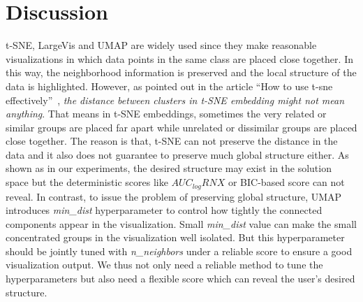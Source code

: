 \section{Discussion}\label{sec:discussion}

t-SNE, LargeVis and UMAP are widely used since they make reasonable visualizations in which data points in the same class are placed close together.
In this way, the neighborhood information is preserved and the local structure of the data is highlighted.
However, as pointed out in the article ``How to use t-sne effectively''~\cite{wattenberg2016use}, \emph{the distance between clusters in t-SNE embedding might not mean anything}.
That means in t-SNE embeddings, sometimes the very related or similar groups are placed far apart while unrelated or dissimilar groups are placed close together.
The reason is that, t-SNE can not preserve the distance in the data and it also does not guarantee to preserve much global structure either.
As shown as in our experiments, the desired structure may exist in the solution space but the deterministic scores like $AUC_{log}RNX$ or BIC-based score can not reveal.
In contrast, to issue the problem of preserving global structure, UMAP introduces \emph{min\_dist} hyperparameter to control how tightly the connected components appear in the visualization.
Small \emph{min\_dist} value can make the small concentrated groups in the visualization well isolated.
But this hyperparameter should be jointly tuned with \emph{n\_neighbors} under a reliable score to ensure a good visualization output.
We thus not only need a reliable method to tune the hyperparameters but also need a flexible score which can reveal the user's desired structure.

